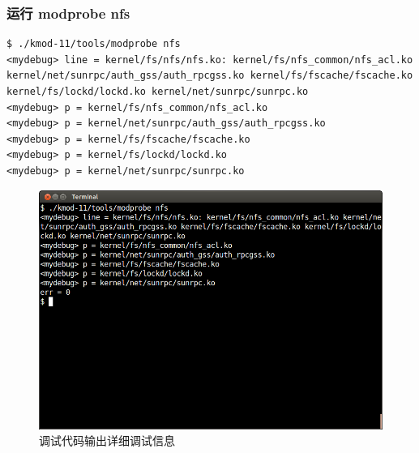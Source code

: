 \documentclass[11pt,a4paper]{article}
\makeatletter
\def\maxwidth{\ifdim\Gin@nat@width>\linewidth\linewidth
\else\Gin@nat@width\fi}
\let\Oldincludegraphics\includegraphics
\renewcommand{\includegraphics}[1]{\Oldincludegraphics[width=\maxwidth]{#1}}
\makeatother
\begin{document}
\subsubsection{运行 modprobe nfs}

{\begin{shaded}\begin{verbatim}
$ ./kmod-11/tools/modprobe nfs
<mydebug> line = kernel/fs/nfs/nfs.ko: kernel/fs/nfs_common/nfs_acl.ko kernel/net/sunrpc/auth_gss/auth_rpcgss.ko kernel/fs/fscache/fscache.ko kernel/fs/lockd/lockd.ko kernel/net/sunrpc/sunrpc.ko
<mydebug> p = kernel/fs/nfs_common/nfs_acl.ko
<mydebug> p = kernel/net/sunrpc/auth_gss/auth_rpcgss.ko
<mydebug> p = kernel/fs/fscache/fscache.ko
<mydebug> p = kernel/fs/lockd/lockd.ko
<mydebug> p = kernel/net/sunrpc/sunrpc.ko
\end{verbatim}\end{shaded}}
\begin{figure}[htbp]
\centering
\includegraphics{./pictures/3-5-print-p-output.png}
\caption{调试代码输出详细调试信息}
\end{figure}
\end{document}
